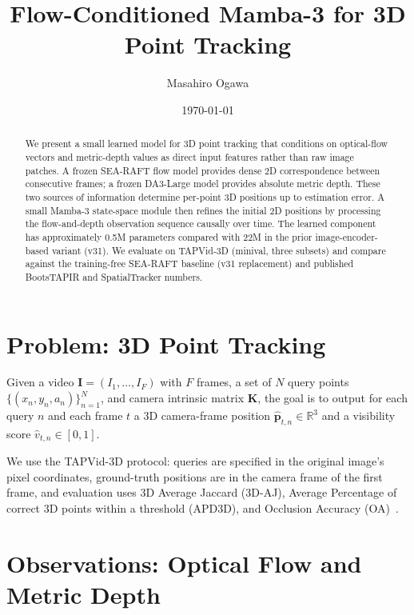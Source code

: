\documentclass[11pt,a4paper]{article}
\title{Flow-Conditioned Mamba-3 for 3D Point Tracking}
\author{Masahiro Ogawa}
\date{\today}
\begin{document}
\maketitle

\begin{abstract}
We present a small learned model for 3D point tracking that conditions
on optical-flow vectors and metric-depth values as direct input
features rather than raw image patches. A frozen SEA-RAFT flow model
provides dense 2D correspondence between consecutive frames; a frozen
DA3-Large model provides absolute metric depth. These two sources of
information determine per-point 3D positions up to estimation error.
A small Mamba-3 state-space module then refines the initial 2D
positions by processing the flow-and-depth observation sequence
causally over time. The learned component has approximately 0.5M
parameters compared with 22M in the prior image-encoder-based variant
(v31). We evaluate on TAPVid-3D (minival, three subsets) and compare
against the training-free SEA-RAFT baseline (v31 replacement) and
published BootsTAPIR and SpatialTracker numbers.
\end{abstract}

\tableofcontents

\section{Problem: 3D Point Tracking}

Given a video $\bm{I} = (I_1, \dots, I_F)$ with $F$ frames, a set of
$N$ query points $\{(x_n, y_n, a_n)\}_{n=1}^{N}$, and camera intrinsic
matrix $\bm{K}$, the goal is to output for each query $n$ and each
frame $t$ a 3D camera-frame position
$\hat{\bm{p}}_{t,n} \in \mathbb{R}^3$ and a visibility score
$\hat{v}_{t,n} \in [0, 1]$.

We use the TAPVid-3D protocol: queries are specified in the original
image's pixel coordinates, ground-truth positions are in the camera
frame of the first frame, and evaluation uses 3D Average Jaccard
(3D-AJ), Average Percentage of correct 3D points within a threshold
(APD3D), and Occlusion Accuracy (OA)~\cite{tapvid3d}.

\section{Observations: Optical Flow and Metric Depth}
\end{document}
